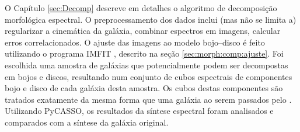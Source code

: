 O Capítulo \ref{sec:Decomp} descreve em detalhes o algoritmo de decomposição
morfológica espectral. O preprocessamento dos dados inclui (mas não se limita a)
regularizar a cinemática da galáxia, combinar espectros em imagens, calcular
erros correlacionados. O ajuste das imagens ao modelo bojo--disco é feito
utilizando o programa IMFIT \citep{Erwin2015}, descrito na seção
\ref{sec:morph:comp:ajuste}. Foi escolhida uma amostra de galáxias que
potencialmente podem ser decompostas em bojos e discos, resultando num conjunto
de cubos espectrais de componentes bojo e disco de cada galáxia desta amostra.
Os cubos destas componentes são tratados exatamente da mesma forma que uma
galáxia ao serem passados pelo \starlight. Utilizando PyCASSO, os resultados da
síntese espectral foram analisados e comparados com a síntese da galáxia
original.

%
% 

